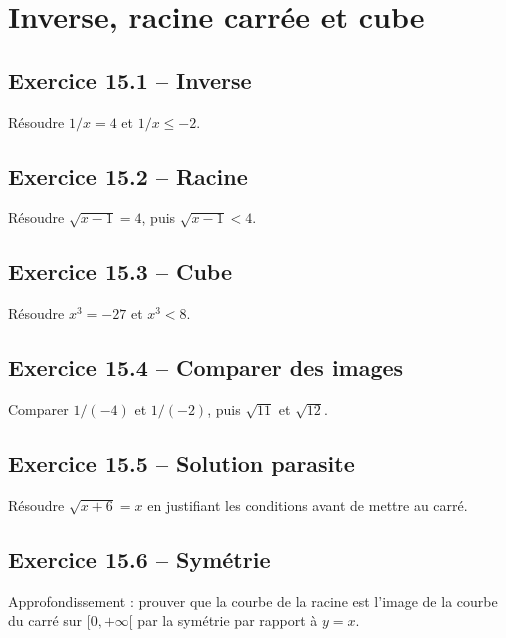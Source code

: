 \chapter{Inverse, racine carrée et cube}
\section*{Exercice 15.1 -- Inverse}
Résoudre $1/x=4$ et $1/x\leq-2$.

\section*{Exercice 15.2 -- Racine}
Résoudre $\sqrt{x-1}=4$, puis $\sqrt{x-1}<4$.

\section*{Exercice 15.3 -- Cube}
Résoudre $x^3=-27$ et $x^3<8$.

\section*{Exercice 15.4 -- Comparer des images}
Comparer $1/(-4)$ et $1/(-2)$, puis $\sqrt{11}$ et $\sqrt{12}$.

\section*{Exercice 15.5 -- Solution parasite}
Résoudre $\sqrt{x+6}=x$ en justifiant les conditions avant de mettre au carré.

\section*{Exercice 15.6 -- Symétrie}
Approfondissement : prouver que la courbe de la racine est l'image de la courbe du carré sur $[0,+\infty[$ par la symétrie par rapport à $y=x$.
